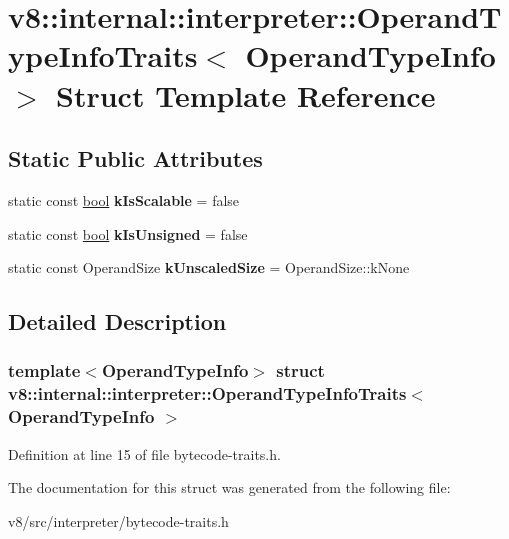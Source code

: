 \hypertarget{structv8_1_1internal_1_1interpreter_1_1OperandTypeInfoTraits}{}\section{v8\+:\+:internal\+:\+:interpreter\+:\+:Operand\+Type\+Info\+Traits$<$ Operand\+Type\+Info $>$ Struct Template Reference}
\label{structv8_1_1internal_1_1interpreter_1_1OperandTypeInfoTraits}
\subsection*{Static Public Attributes}
\begin{DoxyCompactItemize}
\item 
\mbox{\label{structv8_1_1internal_1_1interpreter_1_1OperandTypeInfoTraits_a9e1370644b7ba0b6003ea27d7c2bfba3}} 
static const \mbox{\hyperlink{classbool}{bool}} {\bfseries k\+Is\+Scalable} = false
\item 
\mbox{\label{structv8_1_1internal_1_1interpreter_1_1OperandTypeInfoTraits_a932fbcbd3d53b4a107088e2527ca9947}} 
static const \mbox{\hyperlink{classbool}{bool}} {\bfseries k\+Is\+Unsigned} = false
\item 
\mbox{\label{structv8_1_1internal_1_1interpreter_1_1OperandTypeInfoTraits_a0e718fe3790611613bf986b1b019211d}} 
static const Operand\+Size {\bfseries k\+Unscaled\+Size} = Operand\+Size\+::k\+None
\end{DoxyCompactItemize}


\subsection{Detailed Description}
\subsubsection*{template$<$Operand\+Type\+Info$>$\newline
struct v8\+::internal\+::interpreter\+::\+Operand\+Type\+Info\+Traits$<$ Operand\+Type\+Info $>$}



Definition at line 15 of file bytecode-\/traits.\+h.



The documentation for this struct was generated from the following file\+:\begin{DoxyCompactItemize}
\item 
v8/src/interpreter/bytecode-\/traits.\+h\end{DoxyCompactItemize}
